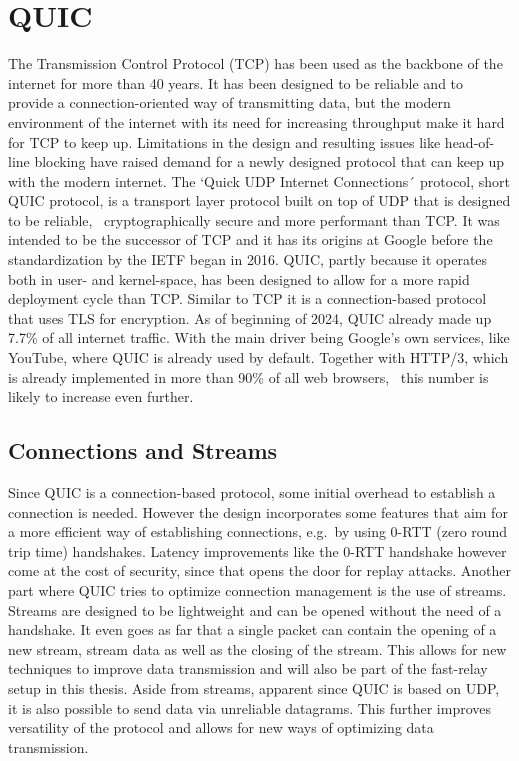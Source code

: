 \section{QUIC}\label{sec:quic_bg}
The Transmission Control Protocol (TCP) has been used as the backbone
of the internet for more than 40 years.
It has been designed to be reliable and to provide a connection-oriented
way of transmitting data, but the modern environment of the internet with
its need for increasing throughput make it hard for TCP to keep up.
Limitations in the design and resulting issues like head-of-line blocking
have raised demand for a newly designed protocol that can keep up with the
modern internet.
The `Quick UDP Internet Connections´ protocol, short QUIC protocol, is a 
transport layer protocol built on top of UDP that is designed to be reliable, \
cryptographically secure and more performant than TCP\@.
It was intended to be the successor of TCP and it has its origins at Google before 
the standardization by the IETF began in 2016.
QUIC, partly because it operates both in user- and kernel-space, has been designed to allow for a 
more rapid deployment cycle than TCP\@.
Similar to TCP it is a connection-based protocol that uses TLS for encryption.
As of beginning of 2024, QUIC already made up 7.7\% of all internet traffic.
With the main driver being Google's own services, like YouTube, where QUIC is already used by default.
Together with HTTP/3, which is already implemented in more than 90\% of all web browsers, \
this number is likely to increase even further.

\subsection{Connections and Streams}
Since QUIC is a connection-based protocol, some initial overhead to establish a connection is needed.
However the design incorporates some features that aim for a more efficient way of establishing 
connections, e.g.\ by using 0-RTT (zero round trip time) handshakes.
Latency improvements like the 0-RTT handshake however come at the cost of security, since that opens 
the door for replay attacks.
Another part where QUIC tries to optimize connection management is the use of streams.
Streams are designed to be lightweight and can be opened without the need of a handshake.
It even goes as far that a single packet can contain the opening of a new stream, stream data
as well as the closing of the stream.
This allows for new techniques to improve data transmission and will also be part of the fast-relay 
setup in this thesis.
Aside from streams, apparent since QUIC is based on UDP, it is also possible to send data via
unreliable datagrams.
This further improves versatility of the protocol and allows for new ways of optimizing data transmission.

